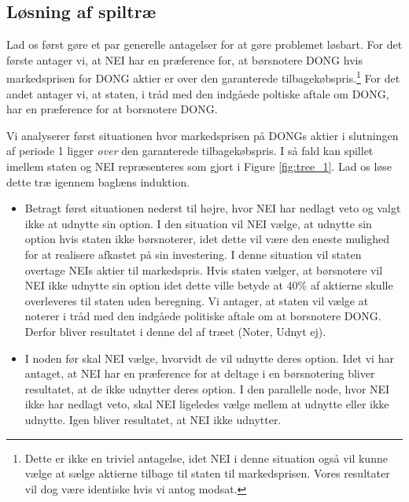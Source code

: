 \documentclass{article}
\begin{document}
\newpage

\FloatBarrier

\begin{appendices}
\renewcommand\appendixname{Appendix}

\section{Løsning af spiltræ}
\label{sec:app_tree}
Lad os først gøre et par generelle antagelser for at gøre problemet løsbart. For det første antager vi, at NEI har en præference for, at børsnotere DONG hvis markedsprisen for DONG aktier er over den garanterede tilbagekøbspris.\footnote{Dette er ikke en triviel antagelse, idet NEI i denne situation også vil kunne vælge at sælge aktierne tilbage til staten til markedsprisen. Vores resultater vil dog være identiske hvis vi antog modsat.} For det andet antager vi, at staten, i tråd med den indgåede poltiske aftale om DONG, har en præference for at borsnotere DONG. %

Vi analyserer først situationen hvor markedsprisen på DONGs aktier i slutningen af periode 1 ligger \textit{over} den garanterede tilbagekøbspris. I så fald kan spillet imellem staten og NEI repræsenteres som gjort i Figure \ref{fig:tree_1}. Lad os løse dette træ igennem baglæns induktion.  

\begin{itemize}

	\item Betragt først situationen nederst til højre, hvor NEI har nedlagt veto og valgt ikke at udnytte sin option. I den situation vil NEI vælge, at udnytte sin option hvis staten ikke børsnoterer, idet dette vil være den eneste mulighed for at realisere afkastet på sin investering. I denne situation vil staten overtage NEIs aktier til markedspris. Hvis staten vælger, at børsnotere vil NEI ikke udnytte sin option idet dette ville betyde at 40\% af aktierne skulle overleveres til staten uden beregning. Vi antager, at staten vil vælge at noterer i tråd med den indgåede politiske aftale om at borsnotere DONG. Derfor bliver resultatet i denne del af træet (Noter, Udnyt ej).

	\item I noden før skal NEI vælge, hvorvidt de vil udnytte deres option. Idet vi har antaget, at NEI har en præference for at deltage i en børsnotering bliver resultatet, at de ikke udnytter deres option. I den parallelle node, hvor NEI ikke har nedlagt veto, skal NEI ligeledes vælge mellem at udnytte eller ikke udnytte. Igen bliver resultatet, at NEI ikke udnytter.
	

\end{itemize}
\end{appendices}
\end{document}
